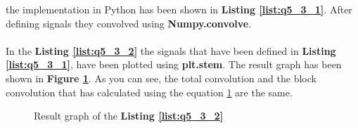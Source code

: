 the implementation in Python has 
been shown in \textbf{Listing \ref{list:q5_3_1}}. After defining 
signals they convolved using \textbf{Numpy.convolve}.


\paragraph{}In the \textbf{Listing \ref{list:q5_3_2}} the 
signals that have been defined in \textbf{Listing \ref{list:q5_3_1}}, have been plotted using 
\textbf{plt.stem}. The result graph has been 
shown in \textbf{Figure \ref{fig:Q5_3}}. As you can see, the 
total convolution and the block convolution that has 
calculated using the equation \ref{fig:Q5_3} are the same.




\begin{figure}[H]
  \centering
  \scalebox{0.4}{}
  \caption{Result graph of the \textbf{Listing \ref{list:q5_3_2}}}
  \label{fig:Q5_3}
\end{figure}